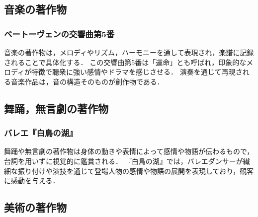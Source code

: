 \documentclass[titlepage,a4paper]{jsarticle}
\begin{document}
\subsection{音楽の著作物}
\subsubsection*{ベートーヴェンの交響曲第5番}
音楽の著作物は，メロディやリズム，ハーモニーを通して表現され，楽譜に記録されることで具体化する．
この交響曲第5番は「運命」とも呼ばれ，印象的なメロディが特徴で聴衆に強い感情やドラマを感じさせる．
演奏を通じて再現される音楽作品は，音の構造そのものが創作物である．
\subsection{舞踊，無言劇の著作物}
\subsubsection*{バレエ『白鳥の湖』}
舞踊や無言劇の著作物は身体の動きや表情によって感情や物語が伝わるもので，台詞を用いずに視覚的に鑑賞される．
『白鳥の湖』では，バレエダンサーが繊細な振り付けや演技を通じて登場人物の感情や物語の展開を表現しており，観客に感動を与える．
\subsection{美術の著作物}
\end{document}
